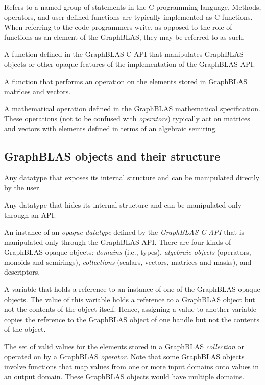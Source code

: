 Refers to a named group of statements in the C programming language.  Methods, operators,
and user-defined functions are typically implemented as C functions.
When referring to 
the code programmers write, as opposed to the role of functions as an element of the GraphBLAS, they may
be referred to as such.

 A function defined in the GraphBLAS C API that manipulates
GraphBLAS objects or other opaque features of the implementation of the GraphBLAS API.

 A function that performs an operation on the elements stored in GraphBLAS matrices and vectors.

 A mathematical operation defined in the
GraphBLAS mathematical specification. These operations (not to be confused with \emph{operators}) typically act
on matrices and vectors with elements defined in terms of an algebraic semiring. 
\glossEnd


\subsection{GraphBLAS objects and their structure}

\glossBegin
{} Any datatype that exposes its internal structure and
can be manipulated directly by the user.   

 Any datatype that hides its internal structure and can
be manipulated only through an API.

  An instance of an \emph{opaque datatype} defined 
by the \emph{GraphBLAS C API} that is manipulated only through the GraphBLAS 
API. There are four kinds of GraphBLAS opaque objects: \emph{domains} (i.e., types), 
\emph{algebraic objects} (operators, monoids and semirings), 
\emph{collections} (scalars, vectors, matrices and masks), and descriptors.   

  A variable that holds a reference to an instance of one of 
the GraphBLAS opaque objects.  The value of this variable holds a reference to 
a GraphBLAS object but not the contents of the object itself.  Hence, assigning 
a value to another variable copies the reference to the GraphBLAS object of one 
handle but not the contents of the object.

 The set of valid values for the elements stored in a 
GraphBLAS \emph{collection} or operated on by a GraphBLAS \emph{operator}.
Note that some GraphBLAS objects involve functions that map values from 
one or more input domains onto values in an output domain.  These GraphBLAS 
objects would have multiple domains.

